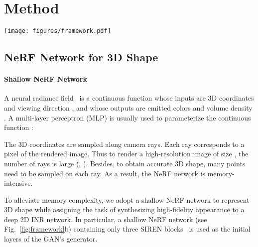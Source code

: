 \documentclass[10pt,twocolumn,letterpaper]{article}
\begin{document}
\section{Method}

\begin{figure*}[!t]
  \begin{center}
\texttt{[image: figures/framework.pdf]}
  \end{center}
  \vspace{-0.65cm}
  \caption{The style-based 3D-aware generator with detailed hyperparameters. The NeRF network is shallow to save runtime memory. The INR network is deep to increase the capacity of the generator. We disentangle 3D shape and appearance, where the NeRF network is responsible for the 3D shape and the INR network for appearance. The auxiliary discriminator helps to overcome the problem of mirror symmetry (see~\cref{sec:mirror_symmetry}). For the INR network, each ModFC is followed by a LeakyReLU (not shown here). }
  \vspace{-0.5cm}
  \label{fig:framework}
\end{figure*}



\subsection{NeRF Network for 3D Shape}


\paragraph{Shallow NeRF Network}

A neural radiance field~\cite{mildenhall2020NeRF} is a continuous function  whose inputs are 3D coordinates  and viewing direction , and whose outputs are emitted colors  and volume density . A multi-layer perceptron (MLP) is usually used to parameterize the continuous function :

The 3D coordinates are sampled along camera rays. Each ray corresponds to a pixel of the rendered image. Thus to render a high-resolution image of size , the number of rays is large (\ie, ). Besides, to obtain accurate 3D shape, many points need to be sampled on each ray. As a result, the NeRF network is memory-intensive.

To alleviate memory complexity, we adopt a shallow NeRF network to represent 3D shape while assigning the task of synthesizing high-fidelity appearance to a deep 2D INR network. In particular, a shallow NeRF network (see Fig.~\ref{fig:framework}b) containing only three SIREN blocks~\cite{sitzmann2020Implicita} is used as the initial layers of the GAN's generator.
\end{document}
